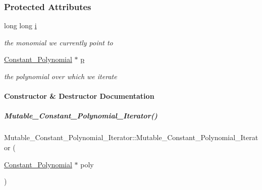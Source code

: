 \subsubsection*{Protected Attributes}
\begin{DoxyCompactItemize}
\item 
\mbox{\label{group___iterator_group_a7f2a05f25113363d7bb763d579aad653}} 
long long \hyperlink{group___iterator_group_a7f2a05f25113363d7bb763d579aad653}{i}
\begin{DoxyCompactList}\small\item\em the monomial we currently point to \end{DoxyCompactList}\item 
\mbox{\label{group___iterator_group_a9a9959010a5e8dc6cfdbef7c65ea26da}} 
\hyperlink{group__polygroup_class_constant___polynomial}{Constant\+\_\+\+Polynomial} $\ast$ \hyperlink{group___iterator_group_a9a9959010a5e8dc6cfdbef7c65ea26da}{p}
\begin{DoxyCompactList}\small\item\em the polynomial over which we iterate \end{DoxyCompactList}\end{DoxyCompactItemize}


\paragraph{Constructor \& Destructor Documentation}
\mbox{\label{group___iterator_group_ac443c5f24675fc7c8fb69bbd167b634b}} 
\subparagraph{\texorpdfstring{Mutable\+\_\+\+Constant\+\_\+\+Polynomial\+\_\+\+Iterator()}{Mutable\_Constant\_Polynomial\_Iterator()}}
{\footnotesize\ttfamily Mutable\+\_\+\+Constant\+\_\+\+Polynomial\+\_\+\+Iterator\+::\+Mutable\+\_\+\+Constant\+\_\+\+Polynomial\+\_\+\+Iterator (\begin{DoxyParamCaption}\item[{\hyperlink{group__polygroup_class_constant___polynomial}{Constant\+\_\+\+Polynomial} $\ast$}]{poly }\end{DoxyParamCaption})\hspace{0.3cm}{\ttfamily [explicit]}}



